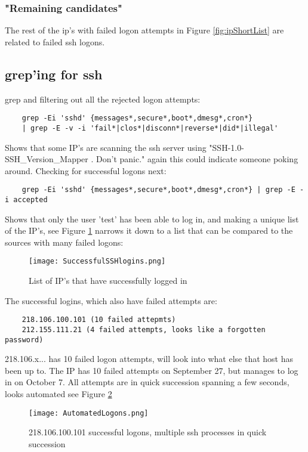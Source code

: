 \documentclass[
	letterpaper, %
	10pt, %
	unnumberedsections, %
	twoside, %
]{APAAssignment}
\begin{document}
\subsubsection{"Remaining candidates"}
The rest of the ip's with failed logon attempts in Figure \ref{fig:ipShortList} are related to failed ssh logons.


\subsection{grep'ing for ssh}
grep and filtering out all the rejected logon attempts:

\begin{verbatim}
	grep -Ei 'sshd' {messages*,secure*,boot*,dmesg*,cron*}
	| grep -E -v -i 'fail*|clos*|disconn*|reverse*|did*|illegal'
\end{verbatim}
Shows that some IP's are scanning the ssh server using "SSH-1.0-SSH\_Version\_Mapper .  Don't panic." again this could indicate someone poking  around. Checking for successful logons next:

\begin{verbatim}
	grep -Ei 'sshd' {messages*,secure*,boot*,dmesg*,cron*} | grep -E -i accepted
\end{verbatim}

Shows that only the user 'test' has been able to log in, and making a unique list of the IP's, see Figure \ref{fig:successfulSSH} narrows it down to a list that can be compared to the sources with many failed logons:


\begin{figure}[!htp] %
	\centering
	\texttt{[image: SuccessfulSSHlogins.png]}
	\caption{List of IP's that have successfully logged in}
	\label{fig:successfulSSH}
\end{figure}

The successful logins, which also have failed attempts are:
\begin{verbatim}
	218.106.100.101 (10 failed attepmts)
	212.155.111.21 (4 failed attempts, looks like a forgotten password)
\end{verbatim}

218.106.x... has 10 failed logon attempts, will look into what else that host has been up to. The IP has 10 failed attempts on September 27, but manages to log in on October 7. All attempts are in quick succession spanning a few seconds, looks automated see Figure \ref{fig:AutomatedLogons}

\begin{figure}[!htp] %
	\centering
	\texttt{[image: AutomatedLogons.png]}
	\caption{218.106.100.101 successful logons, multiple ssh processes in quick succession}
	\label{fig:AutomatedLogons}
\end{figure}
\end{document}
